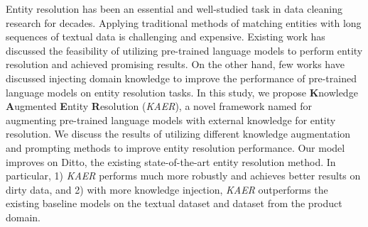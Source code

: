 
Entity resolution has been an essential and well-studied task in data cleaning research for decades. Applying traditional methods of matching entities with long sequences of textual data is challenging and expensive. Existing work has discussed the feasibility of utilizing pre-trained language models to perform entity resolution and achieved promising results. On the other hand, few works have discussed injecting domain knowledge to improve the performance of pre-trained language models on entity resolution tasks. 
In this study, we propose \textbf{K}nowledge \textbf{A}ugmented \textbf{E}ntity \textbf{R}esolution (\textit{KAER}), a novel framework named for augmenting pre-trained language models with external knowledge for entity resolution. We discuss the results of utilizing different knowledge augmentation and prompting methods to improve entity resolution performance. %
Our model improves on Ditto, the existing state-of-the-art entity resolution method. In particular, 1) \textit{KAER} performs much more robustly and achieves better results on dirty data, and 2) with more knowledge injection, \textit{KAER} outperforms the existing baseline models on the textual dataset and dataset from the product domain. 

